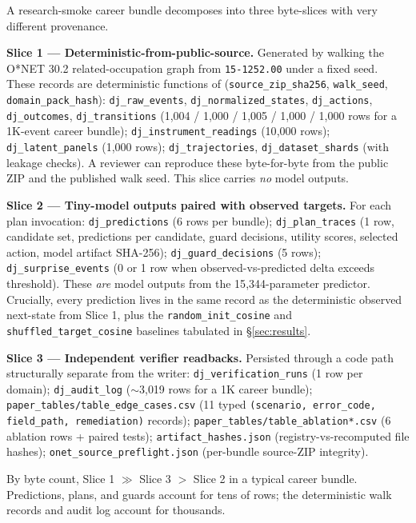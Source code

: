 \documentclass[10pt,twocolumn,letterpaper]{article}
\newcommand{\code}[1]{\texttt{\small #1}}
\begin{document}
A research-smoke career bundle decomposes into three byte-slices
with very different provenance.

\textbf{Slice 1 --- Deterministic-from-public-source.}
Generated by walking the O*NET 30.2 related-occupation graph from
\code{15-1252.00} under a fixed seed. These records are
deterministic functions of \linebreak (\code{source\_zip\_sha256},
\code{walk\_seed}, \code{domain\_pack\_hash}):
\code{dj\_raw\_events}, \code{dj\_normalized\_states},
\code{dj\_actions}, \code{dj\_outcomes}, \code{dj\_transitions}
(1{,}004 / 1{,}000 / 1{,}005 / 1{,}000 / 1{,}000 rows for a 1K-event
career bundle); \code{dj\_instrument\_readings} (10{,}000 rows);
\code{dj\_latent\_panels} (1{,}000 rows); \code{dj\_trajectories},
\code{dj\_dataset\_shards} (with leakage checks). A reviewer can
reproduce these byte-for-byte from the public ZIP and the published
walk seed. This slice carries \emph{no} model outputs.

\textbf{Slice 2 --- Tiny-model outputs paired with observed
targets.} For each plan invocation: \code{dj\_predictions} (6 rows
per bundle); \code{dj\_plan\_traces} (1 row, candidate set,
predictions per candidate, guard decisions, utility scores,
selected action, model artifact SHA-256);
\code{dj\_guard\_decisions} (5 rows); \code{dj\_surprise\_events}
(0 or 1 row when observed-vs-predicted delta exceeds threshold).
These \emph{are} model outputs from the 15{,}344-parameter
predictor. Crucially, every prediction lives in the same record as
the deterministic observed next-state from Slice 1, plus the
\code{random\_init\_cosine} and \code{shuffled\_target\_cosine}
baselines tabulated in \S\ref{sec:results}.

\textbf{Slice 3 --- Independent verifier readbacks.}
Persisted through a code path structurally separate from the
writer: \code{dj\_verification\_runs} (1 row per domain);
\code{dj\_audit\_log} ($\sim$3{,}019 rows for a 1K career bundle);
\code{paper\_tables/table\_edge\_cases.csv} (11 typed
\code{(scenario, error\_code, field\_path, remediation)} records);
\code{paper\_tables/table\_ablation*.csv} (6 ablation rows + paired
tests); \code{artifact\_hashes.json} (registry-vs-recomputed file
hashes); \code{onet\_source\_preflight.json} (per-bundle source-ZIP
integrity).

By byte count, Slice 1 $\gg$ Slice 3 $>$ Slice 2 in a typical
career bundle. Predictions, plans, and guards account for tens of
rows; the deterministic walk records and audit log account for
thousands.
\end{document}

